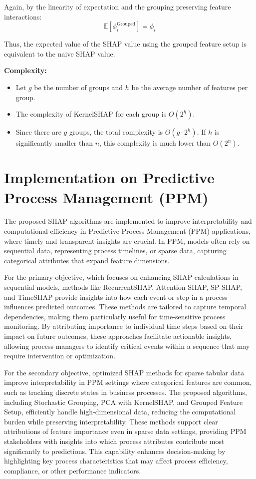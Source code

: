Again, by the linearity of expectation and the grouping preserving feature interactions:
\[ \mathbb{E}[\phi_i^{\text{Grouped}}] = \phi_i \]

Thus, the expected value of the SHAP value using the grouped feature setup is equivalent to the naive SHAP value.

\textbf{Complexity:}
\begin{itemize}
  \item Let $g$ be the number of groups and $h$ be the average number of features per group.
  \item The complexity of KernelSHAP for each group is $O(2^h)$.
  \item Since there are $g$ groups, the total complexity is $O(g \cdot 2^h)$. If $h$ is significantly smaller than $n$, this complexity is much lower than $O(2^n)$.
\end{itemize}

\section{Implementation on Predictive Process Management (PPM)}

The proposed SHAP algorithms are implemented to improve interpretability and computational efficiency in Predictive Process Management (PPM) applications, where timely and transparent insights are crucial. In PPM, models often rely on sequential data, representing process timelines, or sparse data, capturing categorical attributes that expand feature dimensions.

For the primary objective, which focuses on enhancing SHAP calculations in sequential models, methods like RecurrentSHAP, Attention-SHAP, SP-SHAP, and TimeSHAP provide insights into how each event or step in a process influences predicted outcomes. These methods are tailored to capture temporal dependencies, making them particularly useful for time-sensitive process monitoring. By attributing importance to individual time steps based on their impact on future outcomes, these approaches facilitate actionable insights, allowing process managers to identify critical events within a sequence that may require intervention or optimization.

For the secondary objective, optimized SHAP methods for sparse tabular data improve interpretability in PPM settings where categorical features are common, such as tracking discrete states in business processes. The proposed algorithms, including Stochastic Grouping, PCA with KernelSHAP, and Grouped Feature Setup, efficiently handle high-dimensional data, reducing the computational burden while preserving interpretability. These methods support clear attributions of feature importance even in sparse data settings, providing PPM stakeholders with insights into which process attributes contribute most significantly to predictions. This capability enhances decision-making by highlighting key process characteristics that may affect process efficiency, compliance, or other performance indicators.

